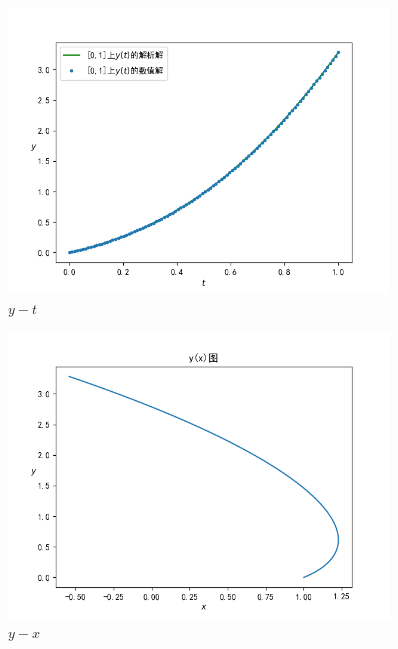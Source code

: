 \begin{figure}[htbp]
    \begin{center}
        \includegraphics[width=0.9\textwidth]{y-t.png}
    \end{center}
   \caption[]{$y-t$}
    \label{fig:y-t}
\end{figure}

\begin{figure}[htbp]
    \begin{center}
        \includegraphics[width=0.9\textwidth]{y-x.png}
    \end{center}
   \caption[]{$y-x$}
    \label{fig:y-x}
\end{figure}